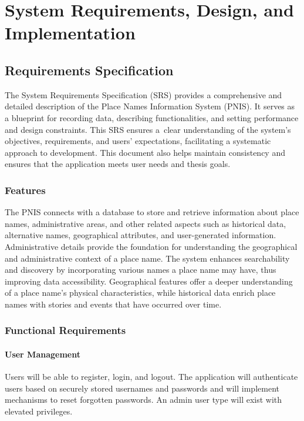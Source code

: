 \chapter{System Requirements, Design, and Implementation}



\section{Requirements Specification}
The System Requirements Specification (SRS) provides a comprehensive and detailed description of the Place Names Information System (PNIS). It serves as a blueprint for recording data, describing functionalities, and setting performance and design constraints. This SRS ensures a~clear understanding of the system's objectives, requirements, and users' expectations, facilitating a systematic approach to development. This document also helps maintain consistency and ensures that the application meets user needs and thesis goals.

\subsection{Features}
The PNIS connects with a database to store and retrieve information about place names, administrative areas, and other related aspects such as historical data, alternative names, geographical attributes, and user-generated information.
Administrative details provide the foundation for understanding the geographical and administrative context of a place name. The system enhances searchability and discovery by incorporating various names a place name may have, thus improving data accessibility. Geographical features offer a deeper understanding of a place name’s physical characteristics, while historical data enrich place names with stories and events that have occurred over time.

\subsection{Functional Requirements}

\subsubsection{User Management}
Users will be able to register, login, and logout. The application will authenticate users based on securely stored usernames and passwords and will implement mechanisms to reset forgotten passwords. An admin user type will exist with elevated privileges.


